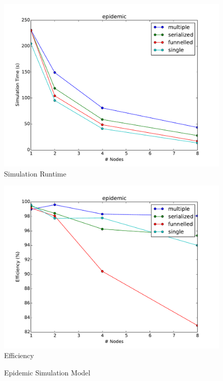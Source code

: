 \documentclass[11pt]{book}
\begin{document}
\pagebreak
\begin{figure}
  \begin{minipage}{.5\textwidth}
    \begin{center}
      \includegraphics[width=\textwidth,keepaspectratio,quiet]{figs/partitioning_communication/communication_epidemic_time.pdf} \\
      Simulation Runtime \\
    \end{center}
  \end{minipage}%
  \hfill
  \begin{minipage}{.5\textwidth}
    \begin{center}
      \includegraphics[width=\textwidth,keepaspectratio,quiet]{figs/partitioning_communication/communication_epidemic_efficiency.pdf} \\
      Efficiency
    \end{center}
  \end{minipage}
  \caption{Epidemic Simulation Model}\label{epidemic_communication}
\end{figure}
\end{document}
